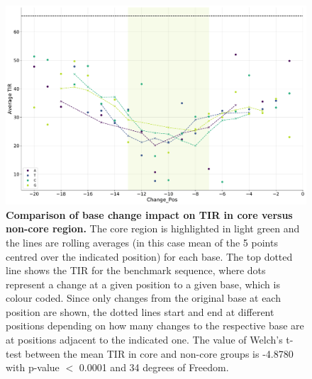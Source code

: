 \documentclass{scrartcl}[2013/05/29]%
\begin{document}
\begin{figure}[!ht]
    \centering
    \includegraphics[scale=0.4]{plots/Supplementary/core_vs_noncore.pdf}
    \caption{\textbf{Comparison of base change impact on TIR in core versus non-core region.} 
    The core region is highlighted in light green and the lines are rolling averages (in this case mean of the 5 points centred over the indicated position) for each base.
    The top dotted line shows the TIR for the benchmark sequence, where dots represent a change at a given position to a given base, which is colour coded.
    Since only changes from the original base at each position are shown, the dotted lines start and end at different positions depending on how many changes to the respective base are at positions adjacent to the indicated one.
    The value of Welch's t-test between the mean TIR in core and non-core groups is -4.8780 with p-value $<$ 0.0001 and 34 degrees of Freedom.}
    \label{fig:core_vs_noncore}
\end{figure}
\end{document}

